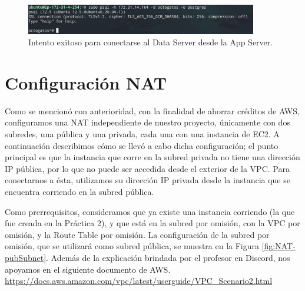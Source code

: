 \documentclass{article}
\begin{document}
\begin{figure}[H]
  \centering
  \includegraphics[width=0.9\textwidth]{DATASERVER/exhibitL}
  \caption{Intento exitoso para conectarse al Data Server desde la App Server.}
  \label{fig:DATASERVER-L}
\end{figure}






\newpage
\section{Configuraci\'on NAT}

Como se mencion\'o con anterioridad, con la finalidad
de ahorrar cr\'editos de AWS, configuramos una NAT
independiente de nuestro proyecto, \'unicamente con
dos subredes, una p\'ublica y una privada, cada una
con una instancia de EC2.   A continuaci\'on describimos
c\'omo se llev\'o a cabo dicha configuraci\'on; el punto
principal es que la instancia que corre en la subred
privada no tiene una direcci\'on IP p\'ublica, por lo
que no puede ser accedida desde el exterior de la VPC.
Para conectarnos a \'esta, utilizamos su direcci\'on
IP privada desde la instancia que se encuentra corriendo
en la subred p\'ublica.

Como prerrequisitos, consideramos que ya existe una
instancia corriendo (la que fue creada en la Pr\'actica
2), y que est\'a en la subred por omisi\'on, con la
VPC por omisi\'on, y la Route Table por omisi\'on.
La configuraci\'on de la subred por omisi\'on, que se
utilizar\'a como subred p\'ublica, se muestra en la
Figura \ref{fig:NAT-pubSubnet}.   Adem\'as de la
explicaci\'on brindada por el profesor en Discord,
nos apoyamos en el siguiente documento de AWS.
\href{https://docs.aws.amazon.com/vpc/latest/userguide/VPC_Scenario2.html}{https://docs.aws.amazon.com/vpc/latest/userguide/VPC\_Scenario2.html}
\end{document}
